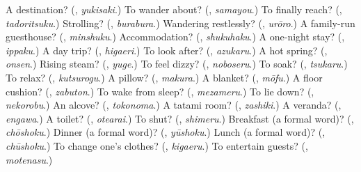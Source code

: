 \begin{tcolorbox}[breakable,colback=teal!4,colframe=teal!35!black,title={Before you move on}]
A destination? (\textbf{}, \emph{yukisaki}.) To wander about? (\textbf{}, \emph{samayou}.) To finally reach? (\textbf{}, \emph{tadoritsuku}.) Strolling? (\textbf{}, \emph{burabura}.) Wandering restlessly? (\textbf{}, \emph{urōro}.) A family-run guesthouse? (\textbf{}, \emph{minshuku}.) Accommodation? (\textbf{}, \emph{shukuhaku}.) A one-night stay? (\textbf{}, \emph{ippaku}.) A day trip? (\textbf{}, \emph{higaeri}.) To look after? (\textbf{}, \emph{azukaru}.) A hot spring? (\textbf{}, \emph{onsen}.) Rising steam? (\textbf{}, \emph{yuge}.) To feel dizzy? (\textbf{}, \emph{noboseru}.) To soak? (\textbf{}, \emph{tsukaru}.) To relax? (\textbf{}, \emph{kutsurogu}.) A pillow? (\textbf{}, \emph{makura}.) A blanket? (\textbf{}, \emph{mōfu}.) A floor cushion? (\textbf{}, \emph{zabuton}.) To wake from sleep? (\textbf{}, \emph{mezameru}.) To lie down? (\textbf{}, \emph{nekorobu}.) An alcove? (\textbf{}, \emph{tokonoma}.) A tatami room? (\textbf{}, \emph{zashiki}.) A veranda? (\textbf{}, \emph{engawa}.) A toilet? (\textbf{}, \emph{otearai}.) To shut? (\textbf{}, \emph{shimeru}.) Breakfast (a formal word)? (\textbf{}, \emph{chōshoku}.) Dinner (a formal word)? (\textbf{}, \emph{yūshoku}.) Lunch (a formal word)? (\textbf{}, \emph{chūshoku}.) To change one's clothes? (\textbf{}, \emph{kigaeru}.) To entertain guests? (\textbf{}, \emph{motenasu}.)
\end{tcolorbox}
